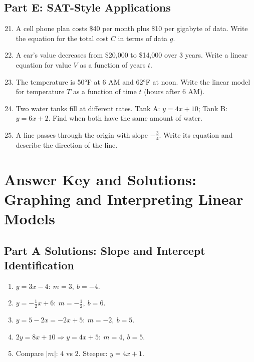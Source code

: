 \documentclass[14pt]{extarticle}
\begin{document}
\subsection*{Part E: SAT-Style Applications}
\begin{enumerate}
    \setcounter{enumi}{20}
    \item A cell phone plan costs \$40 per month plus \$10 per gigabyte of data.  
          Write the equation for the total cost \(C\) in terms of data \(g\).
    \item A car’s value decreases from \$20,000 to \$14,000 over 3 years.  
          Write a linear equation for value \(V\) as a function of years \(t\).
    \item The temperature is 50°F at 6 AM and 62°F at noon.  
          Write the linear model for temperature \(T\) as a function of time \(t\) (hours after 6 AM).
    \item Two water tanks fill at different rates.  
          Tank A: \(y = 4x + 10\); Tank B: \(y = 6x + 2\).  
          Find when both have the same amount of water.
    \item A line passes through the origin with slope \(-\tfrac{3}{4}\).  
          Write its equation and describe the direction of the line.
\end{enumerate}

\newpage


\section*{Answer Key and Solutions: Graphing and Interpreting Linear Models}

\subsection*{Part A Solutions: Slope and Intercept Identification}
\begin{enumerate}
    \item \(y=3x-4:\ m=\boxed{3},\ b=\boxed{-4}\).
    \item \(y=-\tfrac12 x+6:\ m=\boxed{-\tfrac12},\ b=\boxed{6}\).
    \item \(y=5-2x=-2x+5:\ m=\boxed{-2},\ b=\boxed{5}\).
    \item \(2y=8x+10\Rightarrow y=4x+5:\ m=\boxed{4},\ b=\boxed{5}\).
    \item Compare \(|m|\): \(4\) vs \(2\). Steeper: \(\boxed{y=4x+1}\).
\end{enumerate}
\end{document}
